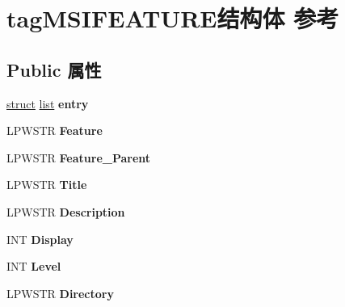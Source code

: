 \hypertarget{structtag_m_s_i_f_e_a_t_u_r_e}{}\section{tag\+M\+S\+I\+F\+E\+A\+T\+U\+R\+E结构体 参考}
\label{structtag_m_s_i_f_e_a_t_u_r_e}
\subsection*{Public 属性}
\begin{DoxyCompactItemize}
\item 
\mbox{\label{structtag_m_s_i_f_e_a_t_u_r_e_aef0b4da3210d5630ac9690097e29ff3a}} 
\hyperlink{interfacestruct}{struct} \hyperlink{classlist}{list} {\bfseries entry}
\item 
\mbox{\label{structtag_m_s_i_f_e_a_t_u_r_e_a68ba25a2b432103dfc7c6e83dc376bab}} 
L\+P\+W\+S\+TR {\bfseries Feature}
\item 
\mbox{\label{structtag_m_s_i_f_e_a_t_u_r_e_a6442838dffe93d10b673a35f1aa39817}} 
L\+P\+W\+S\+TR {\bfseries Feature\+\_\+\+Parent}
\item 
\mbox{\label{structtag_m_s_i_f_e_a_t_u_r_e_ab19b9afd60ffc2741914193b5591967f}} 
L\+P\+W\+S\+TR {\bfseries Title}
\item 
\mbox{\label{structtag_m_s_i_f_e_a_t_u_r_e_a8a5acfc2e9b55f6bcd304e11e5f9d139}} 
L\+P\+W\+S\+TR {\bfseries Description}
\item 
\mbox{\label{structtag_m_s_i_f_e_a_t_u_r_e_a745074ff84c3c308f5f77a8e309024bd}} 
I\+NT {\bfseries Display}
\item 
\mbox{\label{structtag_m_s_i_f_e_a_t_u_r_e_af1d9b3da013267a9b99dcee02641e2c1}} 
I\+NT {\bfseries Level}
\item 
\mbox{\label{structtag_m_s_i_f_e_a_t_u_r_e_a92716631bf7606baa6aa654c6be8be52}} 
L\+P\+W\+S\+TR {\bfseries Directory}
\item 

\end{DoxyCompactItemize}
